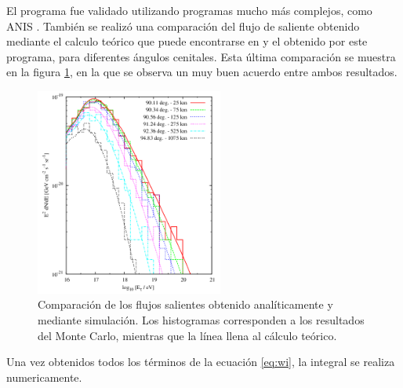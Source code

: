 		El programa fue validado utilizando programas mucho m\'as complejos, como ANIS \cite{anis}.
		Tambi\'en se realiz\'o una comparaci\'on del flujo de \tauon{} saliente obtenido mediante el calculo te\'orico que puede encontrarse en \cite{prop_tau} y el obtenido por este programa, para diferentes \'angulos cenitales.
		Esta \'ultima comparaci\'on se muestra en la figura \ref{fig:comp_tau_mc_teo}, en la que se observa un muy buen acuerdo entre ambos resultados.
		\begin{figure}[ht!]
			\begin{center}
			\includegraphics[width=0.55\textwidth]{fig/simulacionAuger/comp_tau_mc_teo}
			\caption{\label{fig:comp_tau_mc_teo} Comparaci\'on de los flujos salientes obtenido anal\'iticamente y mediante simulaci\'on. Los histogramas corresponden a los resultados del Monte Carlo, mientras que la l\'inea llena al c\'alculo te\'orico.}
			\end{center}
		\end{figure}
		
		
		Una vez obtenidos todos los términos de la ecuación \ref{eq:wi}, la integral se realiza numericamente.